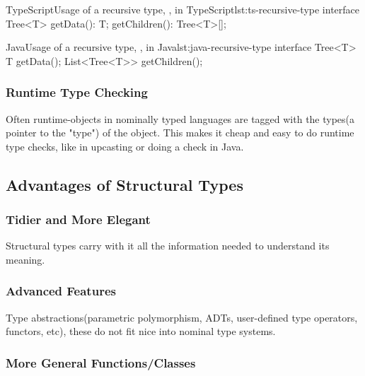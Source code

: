 \begin{code}{TypeScript}{Usage of a recursive type, , in TypeScript}{lst:ts-recursive-type}
    interface Tree<T> {
        getData(): T;
        getChildren(): Tree<T>[];
    }
\end{code}

\begin{code}{Java}{Usage of a recursive type, , in Java}{lst:java-recursive-type}
    interface Tree<T> {
        T getData();
        List<Tree<T>> getChildren();
    }
\end{code}

\subsubsection{Runtime Type Checking}\label{subsubsec:runtime-type-checking}

Often runtime-objects in nominally typed languages are tagged with the types(a pointer to the "type") of the object.
This makes it cheap and easy to do runtime type checks, like in upcasting or doing a  check in Java.

\subsection{Advantages of Structural Types}\label{subsec:advantages-of-structural-types}

\subsubsection{Tidier and More Elegant}\label{subsubsec:tidier-and-more-elegant}

Structural types carry with it all the information needed to understand its meaning.

\subsubsection{Advanced Features}\label{subsubsec:advanced-type-features}

Type abstractions(parametric polymorphism, ADTs, user-defined type operators, functors, etc), these do not fit nice into nominal type systems.

\subsubsection{More General Functions/Classes}\label{subsubsec:more-general-functions}

